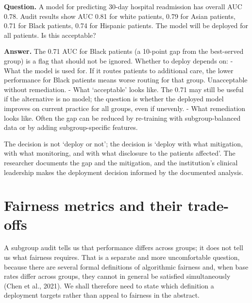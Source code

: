 \documentclass[
  letterpaper,
  11pt]{scrbook}
\begin{document}
\begin{tcolorbox}[enhanced jigsaw, arc=.35mm, bottomrule=.15mm, bottomtitle=1mm, breakable, colback=white, colbacktitle=quarto-callout-note-color!10!white, colframe=quarto-callout-note-color-frame, coltitle=black, left=2mm, leftrule=.75mm, opacityback=0, opacitybacktitle=0.6, rightrule=.15mm, title={Check your understanding: a subgroup gap}, titlerule=0mm, toprule=.15mm, toptitle=1mm]

\textbf{Question.} A model for predicting 30-day hospital readmission
has overall AUC 0.78. Audit results show AUC 0.81 for white patients,
0.79 for Asian patients, 0.71 for Black patients, 0.74 for Hispanic
patients. The model will be deployed for all patients. Is this
acceptable?

\textbf{Answer.} The 0.71 AUC for Black patients (a 10-point gap from
the best-served group) is a flag that should not be ignored. Whether to
deploy depends on: - What the model is used for. If it routes patients
to additional care, the lower performance for Black patients means worse
routing for that group. Unacceptable without remediation. - What
`acceptable' looks like. The 0.71 may still be useful if the alternative
is no model; the question is whether the deployed model improves on
current practice for all groups, even if unevenly. - What remediation
looks like. Often the gap can be reduced by re-training with
subgroup-balanced data or by adding subgroup-specific features.

The decision is not `deploy or not'; the decision is `deploy with what
mitigation, with what monitoring, and with what disclosure to the
patients affected'. The researcher documents the gap and the mitigation,
and the institution's clinical leadership makes the deployment decision
informed by the documented analysis.

\end{tcolorbox}

\section{Fairness metrics and their
trade-offs}\label{sec-fairness-metrics}

A subgroup audit tells us that performance differs across groups; it
does not tell us what fairness requires. That is a separate and more
uncomfortable question, because there are several formal definitions of
algorithmic fairness and, when base rates differ across groups, they
cannot in general be satisfied simultaneously (Chen et al., 2021). We
shall therefore need to state which definition a deployment targets
rather than appeal to fairness in the abstract.
\end{document}
